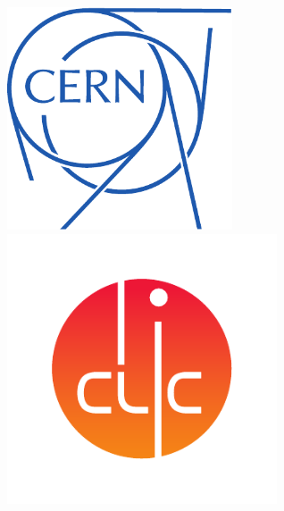 \documentclass[hyperref={colorlinks=true,pdfpagelabels=false,linkcolor=black}, xcolor=dvipsnames,10pt]{beamer}
\begin{document}
{\begin{frame}[plain]
    \begin{columns}
      \centering
      \includegraphics[width=0.5\textwidth]{figures/logo_cern.pdf}
      \centering
      \includegraphics[width=0.6\textwidth]{figures/logo_clic.pdf}
    \end{columns}

    \vspace{1.3cm}
    \titlepage


    \vspace{-0.2cm}


\end{frame}}
\end{document}
